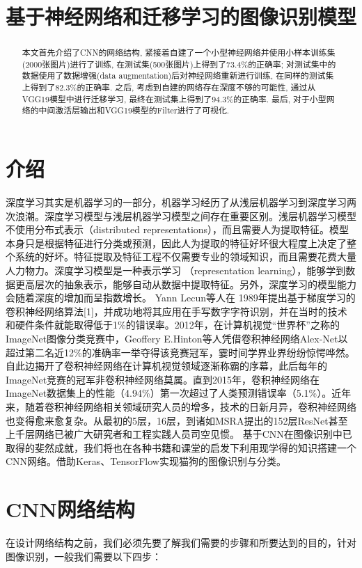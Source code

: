 \documentclass[lang=cn,11pt]{elegantpaper}
\title{基于神经网络和迁移学习的图像识别模型}
\date{}
\begin{document}
\begin{abstract}
	本文首先介绍了CNN的网络结构, 紧接着自建了一个小型神经网络并使用小样本训练集(2000张图片)进行了训练, 在测试集(500张图片)上得到了$73.4\%$的正确率; 对测试集中的数据使用了数据增强(data augmentation)后对神经网络重新进行训练, 在同样的测试集上得到了$82.3\%$的正确率. 之后, 考虑到自建的网络存在深度不够的可能性, 通过从VGG19模型中进行迁移学习, 最终在测试集上得到了$94.3\%$的正确率. 最后, 对于小型网络的中间激活层输出和VGG19模型的Filter进行了可视化. 
\end{abstract}
	
\tableofcontents
\thispagestyle{empty}
\newpage
\normalsize
{}



\section{介绍}
深度学习其实是机器学习的一部分，机器学习经历了从浅层机器学习到深度学习两次浪潮。深度学习模型与浅层机器学习模型之间存在重要区别。浅层机器学习模型不使用分布式表示（distributed representations），而且需要人为提取特征。模型本身只是根据特征进行分类或预测，因此人为提取的特征好坏很大程度上决定了整个系统的好坏。特征提取及特征工程不仅需要专业的领域知识，而且需要花费大量人力物力。深度学习模型是一种表示学习 （representation learning），能够学到数据更高层次的抽象表示，能够自动从数据中提取特征。另外，深度学习的模型能力会随着深度的增加而呈指数增长。
Yann Lecun等人在 1989年提出基于梯度学习的卷积神经网络算法[1]，并成功地将其应用在手写数字字符识别，并在当时的技术和硬件条件就能取得低于1\%的错误率。2012年，在计算机视觉“世界杯”之称的ImageNet图像分类竞赛中，Geoffery E.Hinton等人凭借卷积神经网络Alex-Net以超过第二名近12\%的准确率一举夺得该竞赛冠军，霎时间学界业界纷纷惊愕哗然。自此边揭开了卷积神经网络在计算机视觉领域逐渐称霸的序幕，此后每年的ImageNet竞赛的冠军非卷积神经网络莫属。直到2015年，卷积神经网络在ImageNet数据集上的性能（4.94\%）第一次超过了人类预测错误率（5.1\%）。近年来，随着卷积神经网络相关领域研究人员的增多，技术的日新月异，卷积神经网络也变得愈来愈复杂。从最初的5层，16层，到诸如MSRA提出的152层ResNet甚至上千层网络已被广大研究者和工程实践人员司空见惯。
基于CNN在图像识别中已取得的斐然成就，我们将也在各种书籍和课堂的启发下利用现学得的知识搭建一个CNN网络。借助Keras、TensorFlow实现猫狗的图像识别与分类。


\section{CNN网络结构}
在设计网络结构之前，我们必须先要了解我们需要的步骤和所要达到的目的，针对图像识别，一般我们需要以下四步：
\end{document}
